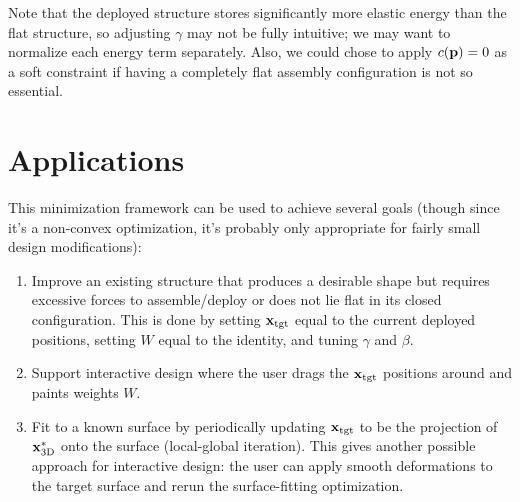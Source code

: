 \documentclass[10pt]{article}
\renewcommand{\vec}[1]{{\bf #1}}
\def\p{\vec{p}}
\def\xdeploy{\vec{x}^*_\text{3D}}
\def\xtgt{\vec{x}_\text{tgt}}
\begin{document}
Note that the deployed structure stores significantly more elastic energy than the flat structure, so adjusting $\gamma$ may not be fully intuitive; we may want to normalize
each energy term separately. Also, we could chose to apply $c(\p) = 0$ as a soft constraint if having a completely flat assembly configuration is not so essential.

\section{Applications}
This minimization framework can be used to achieve several goals (though since
it's a non-convex optimization, it's probably only appropriate for fairly
small design modifications):

\begin{enumerate}[label=(\alph*)]
\item
Improve an existing structure that produces
a desirable shape but requires excessive forces to assemble/deploy or does
not lie flat in its closed configuration. This is done by setting $\xtgt$ equal
to the current deployed positions, setting $W$ equal to the identity, and tuning
$\gamma$ and $\beta$.
\item Support interactive design where the user drags the $\xtgt$ positions around
and paints weights $W$.
\item Fit to a known surface by periodically updating
$\xtgt$ to be the projection of $\xdeploy$ onto the surface (local-global
iteration). This gives another possible approach for interactive design: the
user can apply smooth deformations to the target surface and rerun the
surface-fitting optimization.
\end{enumerate}
\end{document}
